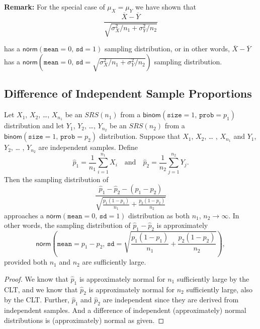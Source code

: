 \textbf{Remark:} For the special case of \(\mu_{X}=\mu_{Y}\) we have shown
 that
\begin{equation}
\frac{\overline{X} - \overline{Y}}{\sqrt{ \sigma_{X}^{2}/ n_{1} + \sigma_{Y}^{2}/n_{2}}}
\end{equation}

has a \(\mathsf{norm}(\mathtt{mean}=0,\,\mathtt{sd}=1)\) sampling
distribution, or in other words, \(\overline{X} - \overline{Y}\) has a
\(\mathsf{norm}(\mathtt{mean} = 0,\,\mathtt{sd} = \sqrt{\sigma_{X}^{2}
/ n_{1} + \sigma_{Y}^{2} / n_{2}})\) sampling distribution.


\subsection{Difference of Independent Sample Proportions}
\label{sec-8-4-2}

\begin{prop}
Let \(X_{1}\), \(X_{2}\), \ldots{}, \(X_{n_{1}}\) be an \(SRS(n_{1})\) from
a \(\mathsf{binom}(\mathtt{size}=1,\,\mathtt{prob}=p_{1})\)
distribution and let \(Y_{1}\), \(Y_{2}\), \ldots{}, \(Y_{n_{2}}\) be an
\(SRS(n_{2})\) from a
\(\mathsf{binom}(\mathtt{size}=1,\,\mathtt{prob}=p_{2})\)
distribution. Suppose that \(X_{1}\), \(X_{2}\), \ldots{} , \(X_{n_{1}}\)
and \(Y_{1}\), \(Y_{2}\), \ldots{} , \(Y_{n_{2}}\) are independent
samples. Define
\begin{equation}
\hat{p}_{1}=\frac{1}{n_{1}}\sum_{i=1}^{n_{1}}X_{i}\quad \mbox{and}\quad \hat{p}_{2}=\frac{1}{n_{2}}\sum_{j=1}^{n_{2}}Y_{j}.
\end{equation}
Then the sampling distribution of
\begin{equation}
\frac{\hat{p}_{1}-\hat{p}_{2}-(p_{1}-p_{2})}{\sqrt{\frac{p_{1}(1-p_{1})}{n_{1}}+\frac{p_{2}(1-p_{2})}{n_{2}}}}
\end{equation}
approaches a \(\mathsf{norm}(\mathtt{mean}=0,\,\mathtt{sd}=1)\) distribution as both \(n_{1},\, n_{2}\to\infty\). In other words, the sampling distribution of \(\hat{p}_{1}-\hat{p}_{2}\) is approximately
\begin{equation}
\mathsf{norm}\left(\mathtt{mean}=p_{1}-p_{2},\,\mathtt{sd}=\sqrt{\frac{p_{1}(1-p_{1})}{n_{1}}+\frac{p_{2}(1-p_{2})}{n_{2}}}\right),
\end{equation}
provided both \(n_{1}\) and \(n_{2}\) are sufficiently large.
\end{prop}

\begin{proof}
We know that \(\hat{p}_{1}\) is approximately normal for \(n_{1}\)
sufficiently large by the CLT, and we know that \(\hat{p}_{2}\) is
approximately normal for \(n_{2}\) sufficiently large, also by the
CLT. Further, \(\hat{p}_{1}\) and \(\hat{p}_{2}\) are independent
since they are derived from independent samples. And a difference of
independent (approximately) normal distributions is (approximately)
normal as given.
\end{proof}

